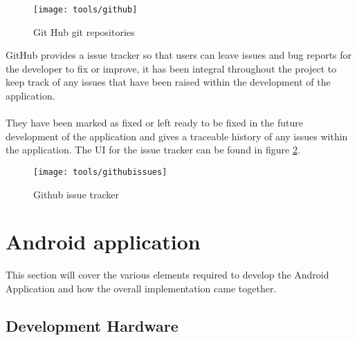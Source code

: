 \begin{figure}[H]
    \centering
    \texttt{[image: tools/github]}
    \caption{Git Hub git repositories}
    \label{fig:git_hub_repos_image}
\end{figure} 

\noindent
GitHub provides a issue tracker so that users can leave issues and bug reports for the developer to fix or improve, it has been integral throughout the project to keep track of any issues that have been raised within the development of the application.\\
\\
They have been marked as fixed or left ready to be fixed in the future development of the application and gives a traceable history of any issues within the application. The UI for the issue tracker can be found in figure \ref{fig:gh_issue_tracker_image}.

\begin{figure}[H]
    \centering
    \texttt{[image: tools/githubissues]}
    \caption{Github issue tracker}
    \label{fig:gh_issue_tracker_image}
\end{figure} 

\section{Android application}

This section will cover the various elements required to develop the Android Application and how the overall implementation came together.

\subsection{Development Hardware}
\label{sec:dev_hardware}

